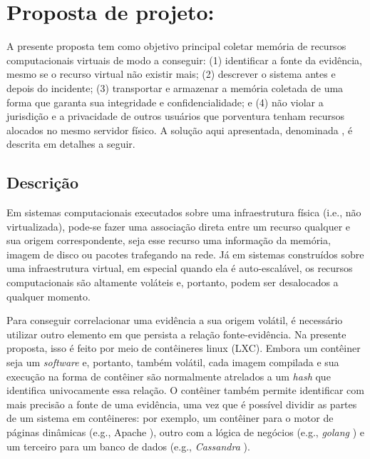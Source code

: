 \chapter{Proposta de projeto: \fancyname}
\label{chp:proposta}

A presente proposta tem como objetivo principal coletar memória de recursos computacionais virtuais de modo a conseguir: 
(1) identificar a fonte da evidência, mesmo se o recurso virtual não existir mais; 
(2) descrever o sistema antes e depois do incidente;
(3) transportar e armazenar a memória coletada de uma forma que garanta sua integridade e confidencialidade; e
(4) não violar a jurisdição e a privacidade de outros usuários que porventura tenham recursos alocados no mesmo servidor físico.
%
A solução aqui apresentada, denominada \fancyname, é descrita em detalhes a seguir.

\section{Descrição}
\label{sec:proposta-desc}

Em sistemas computacionais executados sobre uma infraestrutura física (i.e., não virtualizada), pode-se fazer uma associação direta entre um recurso qualquer e sua origem correspondente, seja esse recurso uma informação da memória, imagem de disco ou pacotes trafegando na rede.
%
Já em sistemas construídos sobre uma infraestrutura virtual, em especial quando ela é auto-escalável, os recursos computacionais são altamente voláteis e, portanto, podem ser desalocados a qualquer momento.


Para conseguir correlacionar uma evidência a sua origem volátil, é necessário utilizar outro elemento em que persista a relação fonte-evidência.
%
Na presente proposta, isso  é feito por meio de contêineres linux (LXC).
%
Embora um contêiner seja um \textit{software} e, portanto, também volátil, cada imagem compilada e sua execução na forma de contêiner são normalmente atrelados a um \textit{hash} que identifica univocamente essa relação.
%
O contêiner também permite identificar com mais precisão a fonte de uma evidência, uma vez que é possível dividir as partes de um sistema em contêineres: por exemplo, um contêiner para o motor de páginas dinâmicas (e.g., Apache%
), outro com a lógica de negócios (e.g., \textit{golang}%
) e um terceiro para um banco de dados (e.g., \textit{Cassandra}%
).

